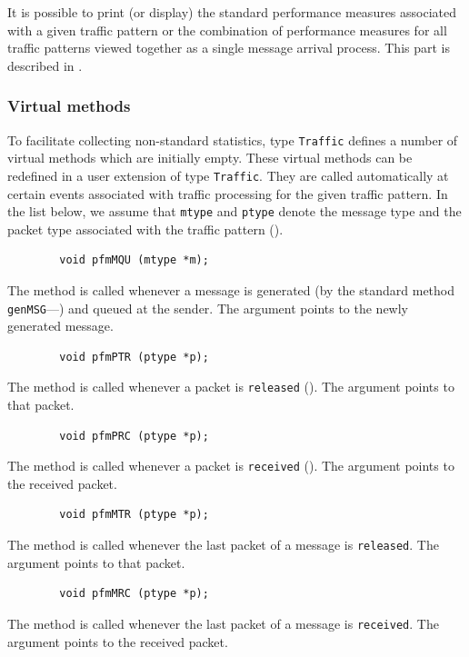 It is possible to print (or display)
the standard performance measures associated
with a given traffic pattern or the combination of performance measures
for all traffic patterns viewed together as a single message arrival
process.
This part is described in .

\subsubsection{Virtual methods}
\label{rm_pm_cl_vm}

To facilitate collecting non-standard statistics, type {\tt Traffic} defines
a number of virtual methods which are initially empty.
These virtual
methods can be redefined in a user extension of type {\tt Traffic}.
They are called automatically at certain events associated with
traffic processing for the given traffic pattern.
In the list below, we assume that {\tt mtype} and {\tt ptype} denote the
message type and the packet type associated with the traffic pattern
().

\begin{verbatim}
        void pfmMQU (mtype *m);
\end{verbatim}
The method is called whenever a message is generated (by the standard method
{\tt genMSG}---) and queued at the sender.
The argument points to the newly generated message.   

\begin{verbatim}
        void pfmPTR (ptype *p);
\end{verbatim}
The method is called whenever a packet is {\tt released}
().
The argument points to that packet.

\begin{verbatim}
        void pfmPRC (ptype *p);
\end{verbatim}
The method is called whenever a packet is {\tt received}
().
The argument points to the received packet.

\begin{verbatim}
        void pfmMTR (ptype *p);
\end{verbatim}
The method is called whenever the last packet of a message is {\tt released}.
The argument points to that packet.

\begin{verbatim}
        void pfmMRC (ptype *p);
\end{verbatim}
The method is called whenever the last packet of a message is {\tt received}.
The argument points to the received packet.

